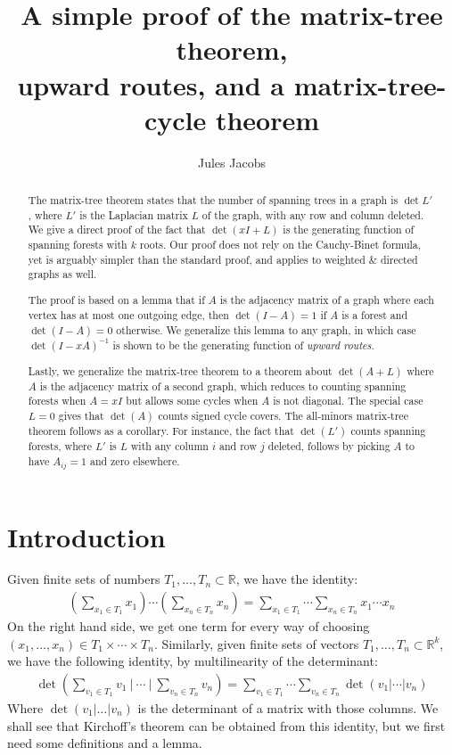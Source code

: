 \documentclass[a4paper, 11pt]{article}
\title{A simple proof of the matrix-tree theorem, \\ upward routes, and a matrix-tree-cycle theorem}
\author{Jules Jacobs}
\newcommand{\R}{\mathbb{R}}
\theoremstyle{definition}
\begin{document}
\maketitle

\begin{abstract}
  The matrix-tree theorem states that the number of spanning trees in a graph is $\det L'$, where $L'$ is the Laplacian matrix $L$ of the graph, with any row and column deleted. We give a direct proof of the fact that $\det(xI + L)$ is the generating function of spanning forests with $k$ roots. Our proof does not rely on the Cauchy-Binet formula, yet is arguably simpler than the standard proof, and applies to weighted \& directed graphs as well.

  The proof is based on a lemma that if $A$ is the adjacency matrix of a graph where each vertex has at most one outgoing edge, then $\det(I - A) = 1$ if $A$ is a forest and $\det(I - A) = 0$ otherwise. We generalize this lemma to any graph, in which case $\det(I-xA)^{-1}$ is shown to be the generating function of \emph{upward routes}.

  Lastly, we generalize the matrix-tree theorem to a theorem about $\det(A + L)$ where $A$ is the adjacency matrix of a second graph, which reduces to counting spanning forests when $A = xI$ but allows some cycles when $A$ is not diagonal. The special case $L=0$ gives that $\det(A)$ counts signed cycle covers. The all-minors matrix-tree theorem follows as a corollary. For instance, the fact that $\det(L')$ counts spanning forests, where $L'$ is $L$ with any column $i$ and row $j$ deleted, follows by picking $A$ to have $A_{ij} = 1$ and zero elsewhere.
\end{abstract}

\section{Introduction}

Given finite sets of numbers $T_1, \dots, T_n \subset \R$, we have the identity:
\begin{align*}
  \left( \sum_{x_1 \in T_1} x_1 \right) \cdots \left( \sum_{x_n \in T_n} x_n \right) =
  \sum_{x_1 \in T_1} \cdots \sum_{x_n \in T_n} x_1 \cdots x_n
\end{align*}
On the right hand side, we get one term for every way of choosing $(x_1,\dots,x_n)\in T_1 \times \cdots \times T_n$. Similarly, given finite sets of vectors $T_1, \dots, T_n \subset \R^k$, we have the following identity, by multilinearity of the determinant:
\begin{align*}
  \det\left(\sum_{v_1 \in T_1} v_1\ \bigg\rvert\ \cdots\ \bigg\rvert\ \sum_{v_n \in T_n} v_n\right) =
  \sum_{v_1 \in T_1} \cdots \sum_{v_n \in T_n} \det \left(v_1 | \cdots | v_n\right)
\end{align*}
Where $\det(v_1 | \dots | v_n)$ is the determinant of a matrix with those columns. We shall see that Kirchoff's theorem can be obtained from this identity, but we first need some definitions and a lemma.
\end{document}
